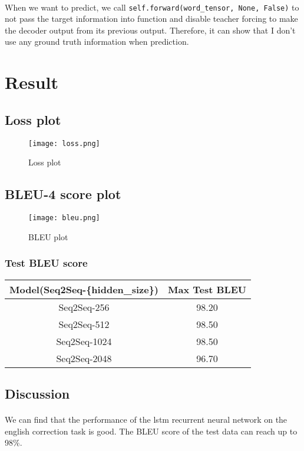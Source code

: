 \paragraph{}
When we want to predict, we call \texttt{self.forward(word\_tensor, None, False)} to not pass the target information into function and disable teacher forcing to make the decoder output from its previous output. Therefore, it can show that I don't use any ground truth information when prediction.
\section{Result}
\subsection{Loss plot}
\begin{figure}[!ht]
    \begin{center} 
        \texttt{[image: loss.png]}
        \caption{Loss plot}
    \end{center} 
\end{figure}
\subsection{BLEU-4 score plot}
\begin{figure}[!ht]
    \begin{center} 
        \texttt{[image: bleu.png]}
        \caption{BLEU plot}
    \end{center} 
\end{figure}
\subsubsection{Test BLEU score}
\begin{center}
\begin{tabular}{ |c|c|  }
\hline
Model(Seq2Seq-\{hidden\_size\}) & Max Test BLEU\\
\hline
Seq2Seq-256 & 98.20\\
Seq2Seq-512 & 98.50\\
Seq2Seq-1024 & 98.50\\
Seq2Seq-2048 & 96.70\\
\hline
\end{tabular}
\end{center}
\subsection{Discussion}
\paragraph{}
We can find that the performance of the lstm recurrent neural network on the english correction task is good. The BLEU score of the test data can reach up to 98\%.
